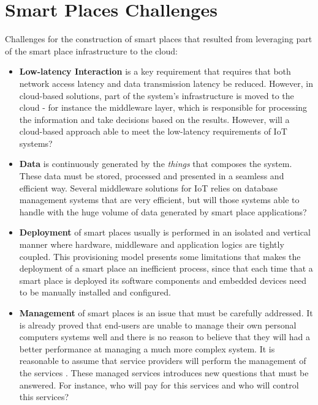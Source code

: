 \section{Smart Places Challenges}
\label{section:challenges}
Challenges \cite{caceres2012ubicomp} for the construction of smart places that resulted from leveraging
part of the smart place infrastructure to the cloud:\\

\begin{itemize}
  \item \textbf{Low-latency Interaction} is a key requirement that requires that both network access
  latency and data transmission latency be reduced. However, in cloud-based solutions, part of the
  system's infrastructure is moved to the cloud - for instance the middleware layer, which is responsible
  for processing the information and take decisions based on the results. However, will a cloud-based
  approach able to meet the low-latency requirements of \gls{IoT} systems?
  \item \textbf{Data} is continuously generated by the \textit{things} that composes the system.
  These data must be stored, processed and presented in a seamless and efficient way. Several
  middleware solutions for \gls{IoT} \cite{floerkemeier2007rfid}\cite{eisenhauer2010hydra}\cite{de2008socrades}
  relies on database management systems that are very efficient, but will those systems able to
  handle with the huge volume of data generated by smart place applications?
  \item \textbf{Deployment} of smart places usually is performed in an isolated and vertical manner
  where hardware, middleware and application logics are tightly coupled. This provisioning model presents
  some limitations that makes the deployment of a smart place an inefficient process, since that each
  time that a smart place is deployed its software components and embedded devices need to be manually
  installed and configured.
  \item \textbf{Management} of smart places is an issue that must be carefully addressed. It is already
  proved that end-users are unable to manage their own personal computers systems well \cite{doll1988measurement}
  and there is no reason to believe that they will had a better performance at managing a much more
  complex system. It is reasonable to assume that service providers will perform the management of
  the services . These managed services introduces new questions that must be answered. For instance,
  who will pay for this services and who will control this services?
\end{itemize}

